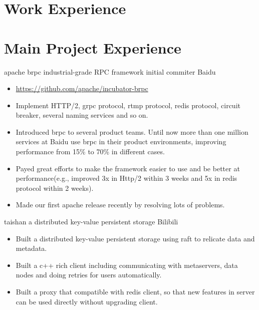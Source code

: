 \documentclass[11pt,a4paper]{moderncv}
\begin{document}
\section{Work Experience}

\section{Main Project Experience}


{apache brpc}
{industrial-grade RPC framework}
{initial commiter}
{Baidu}
{
\begin{itemize}
    \item \url{https://github.com/apache/incubator-brpc}
    \item Implement HTTP/2, grpc protocol, rtmp protocol, redis protocol, circuit breaker, several naming services and so on.
    \item Introduced brpc to several product teams. Until now more than one million services at Baidu use brpc in their product environments, improving performance from 15\% to 70\% in different cases.
    \item Payed great efforts to make the framework easier to use and be better at performance(e.g., improved 3x in Http/2 within 3 weeks and 5x in redis protocol within 2 weeks).
    \item Made our first apache release recently by resolving lots of problems.
\end{itemize}
}

{taishan}
{a distributed key-value persistent storage}
{Bilibili}
{}
{
\begin{itemize}
    \item Built a distributed key-value persistent storage using raft to relicate data and metadata.
    \item Built a c++ rich client including communicating with metaservers, data nodes and doing retries for users automatically.
    \item Built a proxy that compatible with redis client, so that new features in server can be used directly without upgrading client.
\end{itemize}
}
\end{document}
